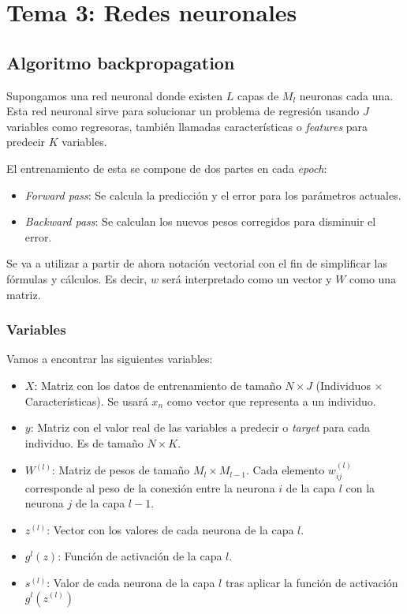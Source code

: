 \chapter{Tema 3: Redes neuronales}
\section{Algoritmo backpropagation}
Supongamos una red neuronal donde existen $L$ capas de $M_l$ neuronas cada una. Esta red neuronal sirve para solucionar un problema de regresión usando $J$ variables como regresoras, también llamadas características o \textit{features} para predecir $K$ variables.

El entrenamiento de esta se compone de dos partes en cada \textit{epoch}:
\begin{itemize}
    \item \textit{Forward pass}: Se calcula la predicción y el error para los parámetros actuales.
    \item \textit{Backward pass}: Se calculan los nuevos pesos corregidos para disminuir el error.
\end{itemize}

Se va a utilizar a partir de ahora notación vectorial con el fin de simplificar las fórmulas y cálculos. Es decir, $w$ será interpretado como un vector y $W$ como una matriz.

\subsection{Variables}
Vamos a encontrar las siguientes variables:

\begin{itemize}
    \item $X$: Matriz con los datos de entrenamiento de tamaño $N \times J$ (Individuos $\times$ Características). Se usará $x_n$ como vector que representa a un individuo.
    
    \item $y$: Matriz con el valor real de las variables a predecir o \textit{target} para cada individuo. Es de tamaño $N \times K$.
    
    \item $W^{(l)}$: Matriz de pesos de tamaño $ M_l \times M_{l-1}$. Cada elemento $w^{(l)}_{ij}$ corresponde al peso de la conexión entre la neurona $i$ de la capa $l$ con la neurona $j$ de la capa $l-1$.
    
    \item $z^{(l)}$: Vector con los valores de cada neurona de la capa $l$.
    
    \item $g^{l}(z)$: Función de activación de la capa $l$.
    
    \item $s^{(l)}$: Valor de cada neurona de la capa $l$ tras aplicar la función de activación $g^{l}(z^{(l)})$
\end{itemize}

